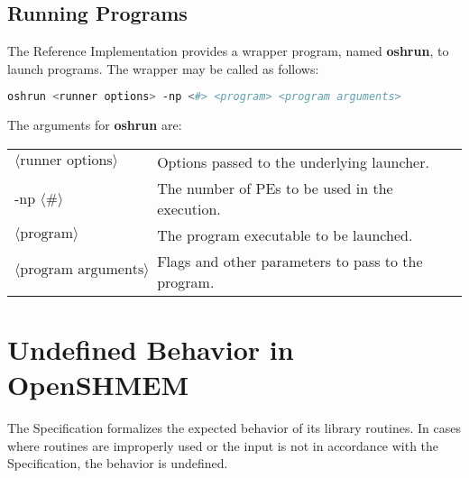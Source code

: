 \section{Running Programs}

The \openshmem Reference Implementation provides a wrapper program, named
\textbf{oshrun}, to launch \openshmem programs.
The wrapper may be called as follows:

\begin{lstlisting}[language=bash]
oshrun <runner options> -np <#> <program> <program arguments>
\end{lstlisting}
The arguments for \textbf{oshrun} are:

\begin{tabular}{p{}p{}}
$\langle\mbox{runner options}\rangle$ & {Options passed to the underlying launcher.}\tabularnewline
-np $\langle\mbox{\#}\rangle$ & {The number of \acp{PE} to be used in the execution.}\tabularnewline
$\langle\mbox{program}\rangle$ & {The program executable to be launched.}\tabularnewline
$\langle\mbox{program arguments}\rangle$ & {Flags and other parameters to pass to the program.}\tabularnewline
\end{tabular}




\chapter{Undefined Behavior in OpenSHMEM}\label{sec:undefined}

The \openshmem Specification formalizes the expected behavior of
its library routines.  In cases where routines are improperly used
or the input is not in accordance with the Specification, the behavior
is undefined.

